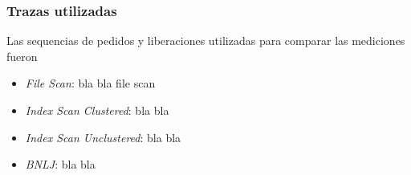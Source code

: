 \subsubsection{Trazas utilizadas}
Las sequencias de pedidos y liberaciones utilizadas para comparar las mediciones fueron
\begin{itemize}
\item \textit{File Scan}: bla bla file scan
\item \textit{Index Scan Clustered}: bla bla
\item \textit{Index Scan Unclustered}: bla bla
\item \textit{BNLJ}: bla bla
\end{itemize}
   
